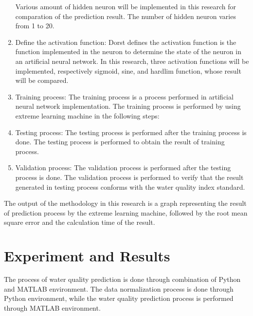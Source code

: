 \documentclass{ws-ijait}
\begin{document}
\begin{enumerate}
Various amount of hidden neuron will be implemented in this research for comparation of the prediction result. The number of hidden neuron varies from 1 to 20.

\item Define the activation function: Dorst\cite{24} defines the activation function is the function implemented in the neuron to determine the state of the neuron in an artificial neural network. In this research, three activation functions will be implemented, respectively sigmoid, sine, and hardlim function, whose result will be compared.

\item Training process: The training process is a process performed in artificial neural network implementation. The training process is performed by using extreme learning machine in the following steps:


\item Testing process: The testing process is performed after the training process is done. The testing process is performed to obtain the result of training process.

\item Validation process: The validation process is performed after the testing process is done. The validation process is performed to verify that the result generated in testing process conforms with the water quality index standard.

\end{enumerate}

The output of the methodology in this research is a graph representing the result of prediction process by the extreme learning machine, followed by the root mean square error and the calculation time of the result.

\section{Experiment and Results}

The process of water quality prediction is done through combination of Python and MATLAB environment. The data normalization process is done through Python environment, while the water quality prediction process is performed through MATLAB environment.
\end{document}
